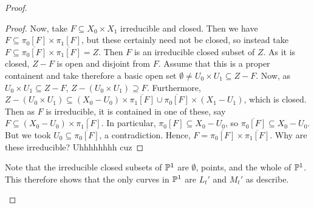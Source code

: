 \begin{proof}
\begin{enumerate}[label = (\alph*)]
\begin{proof}
            Now, take $F \subseteq X_0 \times X_1$ irreducible and closed. Then we have $F \subseteq \pi_0[F] \times \pi_1[F]$, but these certainly need not be closed, so instead take $F \subseteq \overline{\pi_0[F]} \times \overline{\pi_1[F]} = Z$. Then $F$ is an irreducible closed subset of $Z$. As it is closed, $Z - F$ is open and disjoint from $F$. Assume that this is a proper containent and take therefore a basic open set $\emptyset \neq U_0 \times U_1 \subseteq Z - F$. Now, as $U_0 \times U_1 \subseteq Z - F$, $Z - (U_0 \times U_1) \supseteq F$. Furthermore, $Z - (U_0 \times U_1) \subseteq (X_0 - U_0) \times \overline{\pi_1[F]} \cup \overline{\pi_0[F]} \times (X_1 - U_1)$, which is closed. Then as $F$ is irreducible, it is contained in one of these, say $F \subseteq (X_0 - U_0) \times \overline{\pi_1[F]}$. In particular, $\pi_0[F] \subseteq X_0 - U_0$, so $\overline{\pi_0[F]} \subseteq X_0 - U_0$. But we took $U_0 \subseteq \overline{\pi_0[F]}$, a contradiction. Hence, $F = \overline{\pi_0[F]} \times \overline{\pi_1[F]}$. Why are these irreducible? Uhhhhhhhh cuz
        \end{proof}

        Note that the irreducible closed subsets of $\P^1$ are $\emptyset$, points, and the whole of $\P^1$. This therefore shows that the only curves in $\P^1$ are $L_t'$ and $M_t'$ as describe.
    \end{enumerate}
\end{proof}
